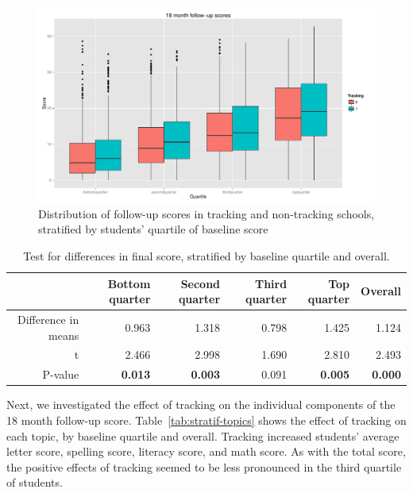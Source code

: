 \documentclass[11pt]{article}
\begin{document}
  \begin{figure}[ht]
 \centering
 \includegraphics[scale=0.4]{tracking-stratif.pdf}
 \caption{Distribution of follow-up scores in tracking and non-tracking schools, stratified by students' quartile of baseline score}
 \label{fig:tracking-stratif}
 \end{figure} 
\begin{table}[ht]
\centering
\begin{tabular}{rrrrrr}
  \hline
 & Bottom quarter & Second quarter & Third quarter & Top quarter & Overall \\ 
  \hline
Difference in means & 0.963 & 1.318 & 0.798 & 1.425 & 1.124 \\ 
  t & 2.466 & 2.998 & 1.690 & 2.810 & 2.493 \\ 
  P-value & {\bf 0.013} & {\bf 0.003} & 0.091 & {\bf 0.005} & {\bf 0.000 }\\ 
   \hline
\end{tabular}
\caption{Test for differences in final score, stratified by baseline quartile and overall.} \label{tab:tracking-stratif}
\end{table} %

Next, we investigated the effect of tracking on the individual components of the 18 month follow-up score.  Table~\ref{tab:stratif-topics} shows the effect of tracking on each topic, by baseline quartile and overall.  Tracking increased students' average letter score, spelling score, literacy score, and math score.  As with the total score, the positive effects of tracking seemed to be less pronounced in the third quartile of students. \\
\end{document}
